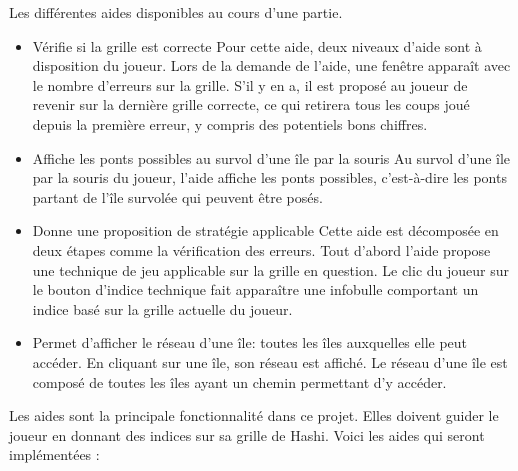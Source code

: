 {
    Les différentes aides disponibles au cours d'une partie.
    \begin{itemize}
		\item {} %
                {Vérifie si la grille est correcte} %
                {  %
                    Pour cette aide, deux niveaux d'aide sont à disposition du joueur. Lors de la demande de l'aide, une fenêtre apparaît avec le nombre d'erreurs sur la grille. S'il y en a, il est proposé au joueur de revenir sur la dernière grille correcte, ce qui retirera tous les coups joué depuis la première erreur, y compris des potentiels bons chiffres.
                } 
		\item {}
                {Affiche les ponts possibles au survol d'une île par la souris}
                {
                    Au survol d'une île par la souris du joueur, l'aide affiche les ponts possibles, c'est-à-dire les ponts partant de l'île survolée qui peuvent être posés.
                }
            \item {}
                {Donne une proposition de stratégie applicable}
                {
                    Cette aide est décomposée en deux étapes comme la vérification des erreurs. Tout d'abord l'aide propose une technique de jeu applicable sur la grille en question. Le clic du joueur sur le bouton d'indice technique fait apparaître une infobulle comportant un indice basé sur la grille actuelle du joueur.
                }
                \item{}
                    {Permet d'afficher le réseau d'une île: toutes les îles auxquelles elle peut accéder.}
                    {
                        En cliquant sur une île, son réseau est affiché. Le réseau d'une île est composé de toutes les îles ayant un chemin permettant d'y accéder.
                    }
                    
	\end{itemize}
}
{
Les aides sont la principale fonctionnalité dans ce projet. Elles doivent guider le joueur en donnant des indices sur sa grille de Hashi. Voici les aides qui seront implémentées :
}